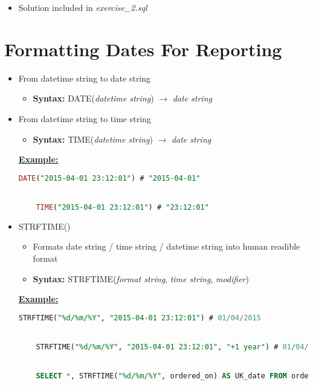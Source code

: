 \documentclass[12pt]{article}
\begin{document}
\bigskip

\begin{itemize}
    \item Solution included in \textit{exercise\_2.sql}
\end{itemize}

\bigskip

\section{Formatting Dates For Reporting}

\bigskip

\begin{itemize}
    \item From datetime string to date string
    \begin{itemize}
        \item \textbf{Syntax:} DATE(\textit{datetime string}) $\to$ \textit{date string}
    \end{itemize}
    \item From datetime string to time string
    \begin{itemize}
        \item \textbf{Syntax:} TIME(\textit{datetime string}) $\to$ \textit{date string}
    \end{itemize}

    \bigskip

    \underline{\textbf{Example:}}

    \bigskip

    \begin{lstlisting}[language=SQL]
    DATE("2015-04-01 23:12:01") # "2015-04-01"


    TIME("2015-04-01 23:12:01") # "23:12:01"
    \end{lstlisting}


    \item STRFTIME()
    \begin{itemize}
        \item Formats date string / time string / datetime string into human readible format
        \item \textbf{Syntax:} STRFTIME(\textit{format string}, \textit{time string}, \textit{modifier})
    \end{itemize}

    \bigskip

    \underline{\textbf{Example:}}

    \bigskip

    \begin{lstlisting}[language=SQL]
    STRFTIME("%d/%m/%Y", "2015-04-01 23:12:01") # 01/04/2015


    STRFTIME("%d/%m/%Y", "2015-04-01 23:12:01", "+1 year") # 01/04/2016


    SELECT *, STRFTIME("%d/%m/%Y", ordered_on) AS UK_date FROM orders;
    \end{lstlisting}
\end{itemize}
\end{document}
